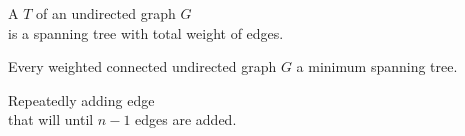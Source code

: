 \begin{frame}{}
  \begin{definition}
    A  $T$ of an  undirected graph $G$ \\
    is a spanning tree with  total weight of edges.
  \end{definition}

  \pause
  \vspace{0.50cm}

  \pause
  \begin{center}
  \end{center}
\end{frame}

\begin{frame}{}
  \begin{theorem}
    Every weighted connected undirected graph $G$  a minimum spanning tree.
  \end{theorem}

  \pause
\end{frame}

\begin{frame}{}

  \begin{center}
  \end{center}
\end{frame}

\begin{frame}{}
  \begin{center}
    Repeatedly adding  edge \\[5pt]
    that will 
    until $n-1$ edges are added.
  \end{center}

  \pause
\end{frame}

\begin{frame}{}

  \begin{center}
  \end{center}
\end{frame}

